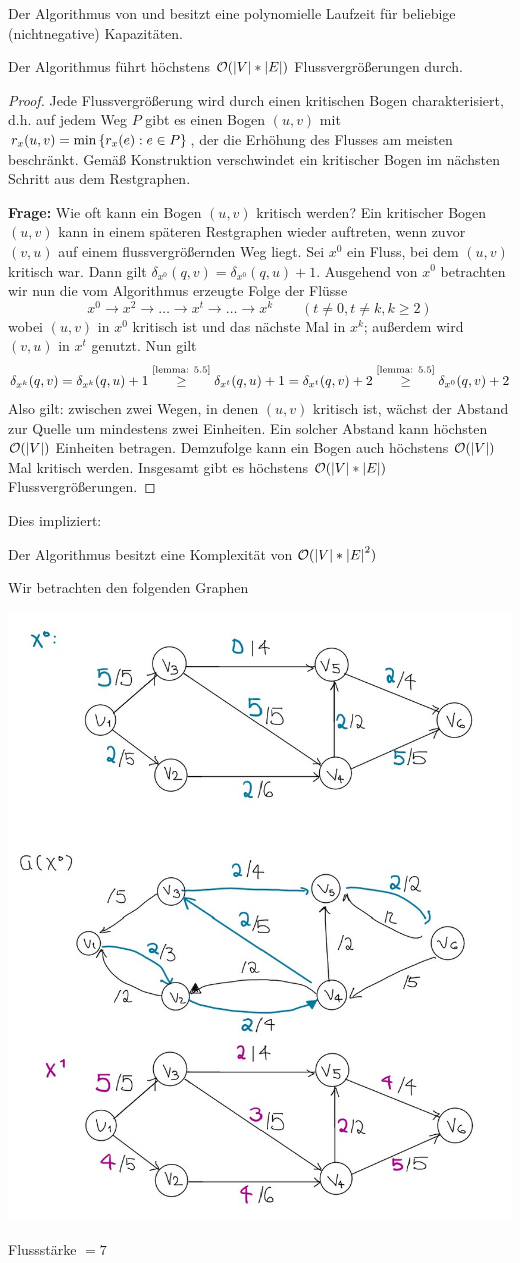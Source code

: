 Der Algorithmus von  und  besitzt eine polynomielle Laufzeit für beliebige (nichtnegative) Kapazitäten.

\begin{lemma}
	Der Algorithmus führt höchstens $\mathcal{O}(\left| V \right| * \left| E \right|)$ Flussvergrößerungen durch.
\end{lemma}
\begin{proof}
	Jede Flussvergrößerung wird durch einen kritischen Bogen charakterisiert, d.h. auf jedem Weg $P$ gibt es einen Bogen $(u,v)$ mit $r_x(u,v) = \min\left\{ r_x(e) : e \in P \right\}$, der die Erhöhung des Flusses am meisten beschränkt. Gemäß Konstruktion verschwindet ein kritischer Bogen im nächsten Schritt aus dem Restgraphen. 
	
	\textbf{Frage:} Wie oft kann ein Bogen $(u,v)$ kritisch werden?  
	Ein kritischer Bogen $(u,v)$ kann in einem späteren Restgraphen wieder auftreten, wenn zuvor $(v,u)$ auf einem flussvergrößernden Weg liegt. Sei $x^0$ ein Fluss, bei dem $(u,v)$ kritisch war. Dann gilt $\delta_{x^0}(q,v) = \delta_{x^0}(q,u) + 1$. Ausgehend von $x^0$ betrachten wir nun die vom Algorithmus erzeugte Folge der Flüsse
	\begin{equation*}
		x^0 \to x^2 \to \dots \to x^t \to \dots \to x^k \qquad (t \neq 0, t \neq k, k \ge 2)
	\end{equation*}
	wobei $(u,v)$ in $x^0$ kritisch ist und das nächste Mal in $x^k$; außerdem wird $(v,u)$ in $x^t$ genutzt. Nun gilt
	\begin{equation*}
		\begin{aligned}
		\delta_{x^k}(q,v) = \delta_{x^k}(q,u) + 1 \overset{\text{\cref{lemma: 5.5}}}{\ge} \delta_{x^t}(q,u) + 1 = \delta_{x^t}(q,v) + 2 \overset{\text{\cref{lemma: 5.5}}}{\ge} \delta_{x^0}(q,v) + 2 
		\end{aligned}
	\end{equation*}
	Also gilt: zwischen zwei Wegen, in denen $(u,v)$ kritisch ist, wächst der Abstand zur Quelle um mindestens zwei Einheiten. Ein solcher Abstand kann höchsten $\mathcal{O}(\left| V \right|)$ Einheiten betragen. Demzufolge kann ein Bogen auch höchstens $\mathcal{O}(\left| V \right|)$ Mal kritisch werden. Insgesamt gibt es höchstens $\mathcal{O}(\left| V \right| * \left| E \right|)$ Flussvergrößerungen.
\end{proof}

Dies impliziert:
\begin{aussage}
	Der Algorithmus besitzt eine Komplexität von $\mathcal{O}(\left| V \right| * \left| E \right|^2)$
\end{aussage}

\begin{beispiel}
Wir betrachten den folgenden Graphen

	\includegraphics[width=.3\linewidth]{./optinum_abb/optinum_5_4_bsp5-5.jpg}

Flussstärke $= 7$
\end{beispiel}